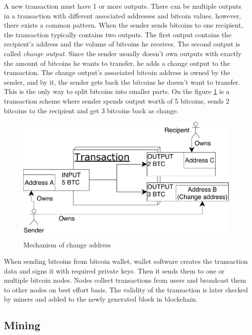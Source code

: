 \documentclass[
  digital, %
  table,   %
  lof,     %
  lot,     %
  oneside
]{fithesis3}
\begin{document}
A new transaction must have 1 or more outputs.
There can be multiple outputs in a transaction with different associated addresses and bitcoin values,
however, there exists a common pattern. When the sender sends bitcoins to one recipient,
the transaction typically contains two outputs.
The first output contains the recipient's address and the volume of bitcoins he receives.
The second output is called \emph{change output}.
Since the sender usually doesn't own outputs with exactly the amount of bitcoins
he wants to transfer, he adds a change output to the transaction.
The change output's associated bitcoin address is owned by the sender,
and by it, the sender gets back the bitcoins he doesn't want to transfer.
This is the only way to split bitcoins into smaller parts. 
On the figure \ref{change} is a transaction scheme where sender spends output worth of 5 bitcoins,
sends 2 bitcoins to the recipient and get 3 bitcoins back as change. 
 
\begin{figure}[!htb]
    \centering
    \includegraphics[width=1\textwidth]{change.pdf}
    \caption{Mechanism of change address}
    \label{change}
\end{figure}
 
When sending bitcoins from bitcoin wallet,
 wallet software creates the transaction data and signs it with required private keys.
 Then it sends them to one or multiple bitcoin nodes.
Nodes collect transactions from users and broadcast them to other nodes on best effort basis.
The validity of the transaction is later checked by miners and added to the newly generated block
in blockchain.

\subsection{Mining}
\end{document}
